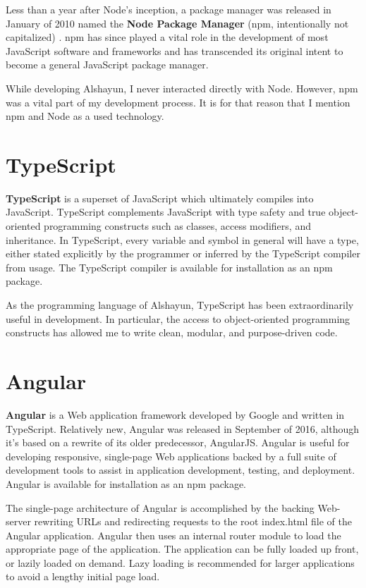 \documentclass[12pt]{report}
\begin{document}
Less than a year after Node's inception, a package manager was released in
January of 2010 named the \textbf{Node Package Manager} (npm, intentionally not
capitalized) \cite{npm}. npm has since played a vital role in the development of
most JavaScript software and frameworks and has transcended its original intent
to become a general JavaScript package manager.

While developing Alshayun, I never interacted directly with Node. However, npm
was a vital part of my development process. It is for that reason that I mention
npm and Node as a used technology.

    \section{TypeScript}

\textbf{TypeScript} \cite{typescript} is a superset of JavaScript which
ultimately compiles into JavaScript. TypeScript complements JavaScript with type
safety and true object-oriented programming constructs such as classes, access
modifiers, and inheritance. In TypeScript, every variable and symbol in general
will have a type, either stated explicitly by the programmer or inferred by the
TypeScript compiler from usage. The TypeScript compiler is available for
installation as an npm package.

As the programming language of Alshayun, TypeScript has been extraordinarily
useful in development. In particular, the access to object-oriented programming
constructs has allowed me to write clean, modular, and purpose-driven code.

    \section{Angular}

\textbf{Angular} \cite{angular} is a Web application framework developed by
Google and written in TypeScript.  Relatively new, Angular was released in
September of 2016, although it's based on a rewrite of its older predecessor,
AngularJS. Angular is useful for developing responsive, single-page Web
applications backed by a full suite of development tools to assist in
application development, testing, and deployment. Angular is available for
installation as an npm package.

The single-page architecture of Angular is accomplished by the backing
Web-server rewriting URLs and redirecting requests to the root index\@.html file
of the Angular application. Angular then uses an internal router module to load
the appropriate page of the application. The application can be fully loaded up
front, or lazily loaded on demand. Lazy loading is recommended for larger
applications to avoid a lengthy initial page load.
\end{document}
